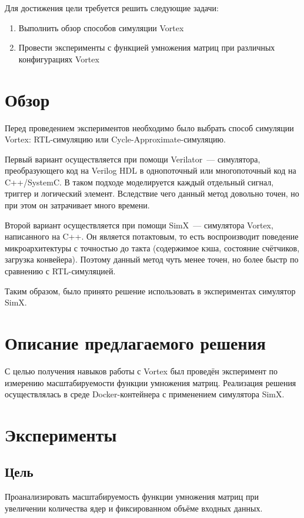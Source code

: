 \documentclass[a4paper]{article}
\begin{document}
Для достижения цели требуется решить следующие задачи:
\begin{enumerate}
    \item Выполнить обзор способов симуляции Vortex
    \item Провести эксперименты с функцией умножения матриц при различных конфигурациях Vortex
\end{enumerate}

\section{Обзор}

Перед проведением экспериментов необходимо было выбрать способ симуляции Vortex: RTL-симуляцию или Cycle-Approximate-симуляцию.

Первый вариант осуществляется при помощи Verilator~--- симулятора, преобразующего код на Verilog HDL в однопоточный или многопоточный код на C++/SystemC. В таком подходе моделируется каждый отдельный сигнал, триггер и логический элемент. Вследствие чего данный метод довольно точен, но при этом он затрачивает много времени.

Второй вариант осуществляется при помощи SimX~--- симулятора Vortex, написанного на C++. Он является потактовым, то есть воспроизводит поведение микроархитектуры с точностью до такта (содержимое кэша, состояние счётчиков, загрузка конвейера). Поэтому данный метод чуть менее точен, но более быстр по сравнению с RTL-симуляцией.

Таким образом, было принято решение использовать в экспериментах симулятор SimX.

\section{Описание предлагаемого решения}

С целью получения навыков работы с Vortex был проведён эксперимент по измерению масштабируемости функции умножения матриц. Реализация решения осуществлялась в среде Docker-контейнера с применением симулятора SimX.

\section{Эксперименты}

\subsection*{Цель}
Проанализировать масштабируемость функции умножения матриц при увеличении количества ядер и фиксированном объёме входных данных.
\end{document}
